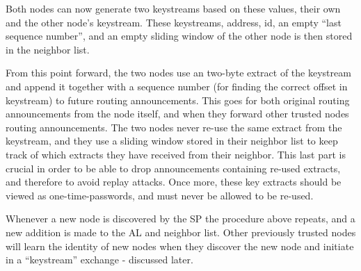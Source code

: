 Both nodes can now generate two keystreams based on these values, their own and
the other node's keystream. These keystreams, address, id, an empty ``last
sequence number'', and an empty sliding window of the other node is then stored
in the neighbor list.


From this point forward, the two nodes use an two-byte extract of the keystream
and append it together with a sequence number (for finding the correct offset
in keystream) to future routing announcements. This goes for both original
routing announcements from the node itself, and when they forward other trusted
nodes routing announcements. The two nodes never re-use the same extract from
the keystream, and they use a sliding window stored in their neighbor list to
keep track of which extracts they have received from their neighbor. This last
part is crucial in order to be able to drop announcements containing re-used
extracts, and therefore to avoid replay attacks. Once more, these key extracts
should be viewed as one-time-passwords, and must never be allowed to be re-used.

Whenever a new node is discovered by the \ac{SP} the procedure above repeats,
and a new addition is made to the \ac{AL} and neighbor list. Other previously
trusted nodes will learn the identity of new nodes when they discover the new
node and initiate in a ``keystream'' exchange - discussed later.

